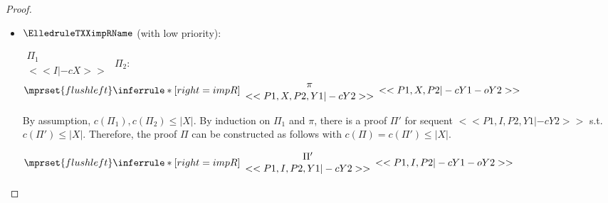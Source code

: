 \begin{proof}
\begin{enumerate}
\begin{itemize}
  \item $\ElledruleTXXimpRName$ (with low priority): 
      \begin{center}
        \scriptsize
        \begin{math}
          \begin{array}{c}
            \Pi_1 \\
            {<<I |-c X>>}
          \end{array}
        \end{math}
        \qquad\qquad
        $\Pi_2$:
        \begin{math}
          $$\mprset{flushleft}
          \inferrule* [right={\tiny impR}] {
            {
              \begin{array}{c}
                \pi \\
                {<<P1, X, P2, Y1 |-c Y2>>}
              \end{array}
            }
          }{<<P1, X, P2 |-c Y1 -o Y2>>}
        \end{math}
      \end{center}
      By assumption, $c(\Pi_1),c(\Pi_2)\leq |X|$. By induction on $\Pi_1$ and $\pi$, there
      is a proof $\Pi'$ for sequent $<<P1, I, P2, Y1 |-c Y2>>$ s.t. $c(\Pi') \leq |X|$.
      Therefore, the proof $\Pi$ can be constructed as follows with
      $c(\Pi) = c(\Pi') \leq |X|$.
      \begin{center}
        \scriptsize
        \begin{math}
          $$\mprset{flushleft}
          \inferrule* [right={\tiny impR}] {
            {
              \begin{array}{c}
                \Pi' \\
                {<<P1, I, P2, Y1 |-c Y2>>}
              \end{array}
            }
          }{<<P1, I, P2 |-c Y1 -o Y2>>}
        \end{math}
      \end{center}


\end{itemize}
\end{enumerate}
\end{proof}
